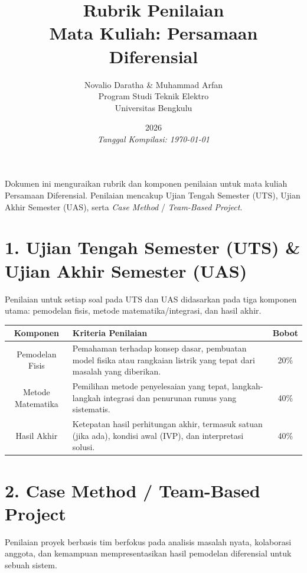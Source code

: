 \documentclass[11pt,a4paper]{article}
\title{\vspace{-2cm}\textbf{Rubrik Penilaian\\Mata Kuliah: Persamaan Diferensial}}
\author{Novalio Daratha \& Muhammad Arfan\\Program Studi Teknik Elektro\\Universitas Bengkulu}
\date{2026 \\ \vspace{2mm}\small\textit{Tanggal Kompilasi: \today}}
\begin{document}
\maketitle

\begin{tcolorbox}[colback=blue!5!white,colframe=blue!75!black,title=Deskripsi Umum]
Dokumen ini menguraikan rubrik dan komponen penilaian untuk mata kuliah Persamaan Diferensial. Penilaian mencakup Ujian Tengah Semester (UTS), Ujian Akhir Semester (UAS), serta \textit{Case Method} / \textit{Team-Based Project}.
\end{tcolorbox}

\section*{1. Ujian Tengah Semester (UTS) \& Ujian Akhir Semester (UAS)}
Penilaian untuk setiap soal pada UTS dan UAS didasarkan pada tiga komponen utama: pemodelan fisis, metode matematika/integrasi, dan hasil akhir. 

\begin{table}[h]
\centering
\renewcommand{\arraystretch}{1.5}
\begin{tabularx}{\textwidth}{|c|X|c|}
\hline
\textbf{Komponen} & \textbf{Kriteria Penilaian} & \textbf{Bobot} \\
\hline
Pemodelan Fisis & Pemahaman terhadap konsep dasar, pembuatan model fisika atau rangkaian listrik yang tepat dari masalah yang diberikan. & 20\% \\
\hline
Metode Matematika & Pemilihan metode penyelesaian yang tepat, langkah-langkah integrasi dan penurunan rumus yang sistematis. & 40\% \\
\hline
Hasil Akhir & Ketepatan hasil perhitungan akhir, termasuk satuan (jika ada), kondisi awal (IVP), dan interpretasi solusi. & 40\% \\
\hline
\end{tabularx}
\end{table}

\section*{2. Case Method / Team-Based Project}
Penilaian proyek berbasis tim berfokus pada analisis masalah nyata, kolaborasi anggota, dan kemampuan mempresentasikan hasil pemodelan diferensial untuk sebuah sistem.
\end{document}
